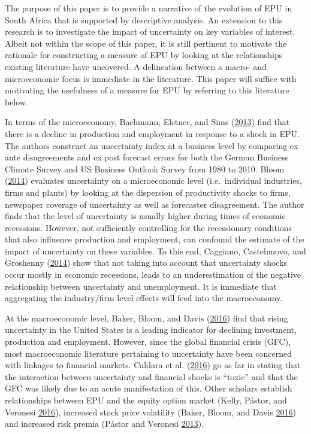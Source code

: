 \documentclass[11pt,preprint, authoryear]{elsarticle}
\numberwithin{equation}{section}
\numberwithin{figure}{section}
\numberwithin{table}{section}
\begin{document}
The purpose of this paper is to provide a narrative of the
evolution of EPU in South Africa that is supported by descriptive analysis. An extension to this research
is to investigate the impact of uncertainty on key variables of
interest. Albeit not within the scope of this paper, it is still
pertinent to motivate the rationale for constructing a measure of EPU by
looking at the relationships existing literature have uncovered. A
delineation between a macro- and microeconomic focus is immediate in
the literature. This paper will suffice with motivating the usefulness
of a measure for EPU by referring to this literature below.

In terms of the microeconomy, Bachmann, Elstner, and Sims
(\protect\hyperlink{ref-Bachmann2013}{2013}) find that there is a
decline in production and employment in response to a shock in EPU. The authors construct an uncertainty index at a business level by comparing ex ante disagreements and ex post forecast errors for both the German Business Climate Survey and US Business Outlook Survey from 1980 to 2010. Bloom (\protect\hyperlink{ref-Bloom2014}{2014}) evaluates uncertainty on a microeconomic level (i.e.~individual industries, firms and plants) by looking at the dispersion of productivity shocks to firms, newspaper coverage of uncertainty as well as forecaster disagreement. The author finds that the level of uncertainty is usually higher during times of economic recessions. However, not sufficiently controlling for the recessionary conditions that also influence production and employment, can confound the estimate of the impact of uncertainty on these variables. To this end, Caggiano, Castelnuovo, and Groshenny (\protect\hyperlink{ref-Caggiano2014}{2014}) show that not taking into account that uncertainty shocks occur mostly in economic recessions, leads to an underestimation of the negative relationship between uncertainty and unemployment. It is immediate that aggregating the industry/firm level effects will feed into the macroeconomy.

At the macroeconomic level, Baker, Bloom, and Davis
(\protect\hyperlink{ref-Baker2016}{2016}) find that rising uncertainty
in the United States is a leading indicator for declining investment,
production and employment. However, since the global financial crisis
(GFC), most macroeconomic literature pertaining to uncertainty have been
concerned with linkages to financial markets. Caldara et al.
(\protect\hyperlink{ref-Caldara2016}{2016}) go as far in stating that
the interaction between uncertainty and financial shocks is ``toxic''
and that the GFC was likely due to an acute manifestation of this. Other
scholars establish relationships between EPU and the equity option
market (Kelly, Pástor, and Veronesi
\protect\hyperlink{ref-Kelly2016}{2016}), increased stock price
volatility (Baker, Bloom, and Davis
\protect\hyperlink{ref-Baker2016}{2016}) and increased risk premia
(Pástor and Veronesi \protect\hyperlink{ref-Pastor2013}{2013}).
\end{document}
